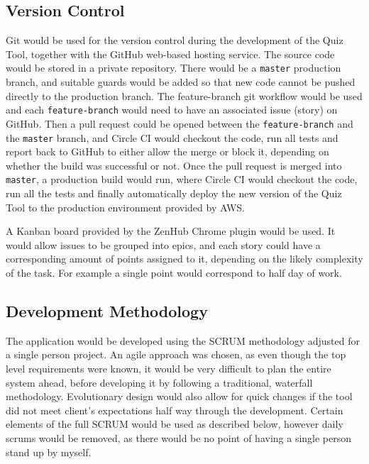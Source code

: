 \subsection{Version Control}
\label{subsection:versioncontrol}
Git\cite{29} would be used for the version control during the development of the Quiz Tool, together with
the GitHub\cite{30} web-based hosting service. The source code would be stored in a private
repository. There would be a \texttt{master} production branch, and suitable guards would be added
so that new code cannot be pushed directly to the production branch. The feature-branch git
workflow\cite{31} would be used and each \texttt{feature-branch} would need to have an associated issue
(story) on GitHub. Then a pull request could be opened between the \texttt{feature-branch} and the \texttt{master}
branch, and Circle CI would checkout the code, run all tests and report back to GitHub to either
allow the merge or block it, depending on whether the build was successful or not. Once the pull request
is merged into \texttt{master}, a production build would run, where Circle CI would checkout the code, run
all the tests and finally automatically deploy the new version of the Quiz Tool to the production
environment provided by AWS.

A Kanban board provided by the ZenHub Chrome plugin\cite{32} would be used. It would allow issues to be grouped
into epics, and each story could have a corresponding amount of points assigned to it, depending
on the likely complexity of the task. For example a single point would correspond to half day of work.

\subsection{Development Methodology}
\label{subsection:scrum}
The application would be developed using the SCRUM methodology adjusted for a single person project.
An agile approach was chosen, as even though the top level requirements were known, it would
be very difficult to plan the entire system ahead, before developing it by following a traditional,
waterfall methodology. Evolutionary design would also allow for quick changes if the tool
did not meet client's expectations half way through the development. Certain elements of the full
SCRUM would be used as described below, however daily scrums would be removed, as there would
be no point of having a single person stand up by myself.

